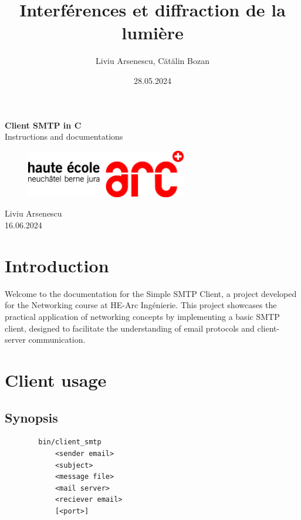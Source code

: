 \documentclass[12pt,a4paper]{article}
\title{Interférences et diffraction de la lumière}
\author{Liviu Arsenescu, Cătălin Bozan}
\date{28.05.2024}
\begin{document}
    \begin{titlepage}
        \begin{center}
            \vspace*{\fill}
            \Huge \textbf{Client SMTP in C} \\
            \Large Instructions and documentations \\
            \begin{figure}[h]
                \centering
                \includegraphics[width=7cm]{hearclogo.png}
            \end{figure}
            \vspace{\fill}
            \Large Liviu Arsenescu \\
            16.06.2024

            \vspace*{\fill}
        \end{center}
    \end{titlepage}

    \tableofcontents
    \newpage

    \section{Introduction}
    Welcome to the documentation for the Simple SMTP Client, a project developed for the Networking course at HE-Arc Ingénierie. This project showcases the practical application of networking concepts by implementing a basic SMTP client, designed to facilitate the understanding of email protocols and client-server communication.
    \section{Client usage}
    \subsection{Synopsis}
    \begin{verbatim}
        bin/client_smtp
            <sender email>
            <subject>
            <message file>
            <mail server>
            <reciever email>
            [<port>]
    \end{verbatim}
\end{document}
